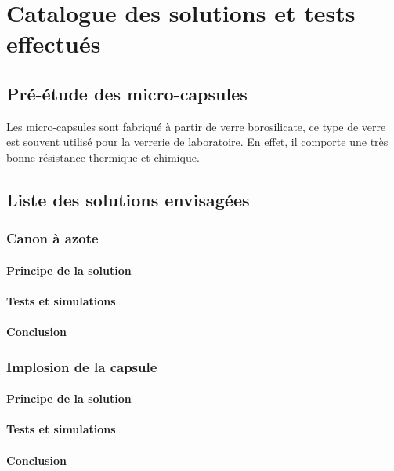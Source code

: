 \section{Catalogue des solutions et tests effectués}
\subsection{Pré-étude des micro-capsules}

Les micro-capsules sont fabriqué à partir de verre borosilicate, ce type 
de verre est souvent utilisé pour la verrerie de laboratoire. En effet, il comporte une 
très bonne résistance thermique et chimique.


\subsection{Liste des solutions envisagées}
\subsubsection{Canon à azote}
\paragraph{Principe de la solution}

\paragraph{Tests et simulations}

\paragraph{Conclusion}

\subsubsection{Implosion de la capsule}
\paragraph{Principe de la solution}

\paragraph{Tests et simulations}

\paragraph{Conclusion}


